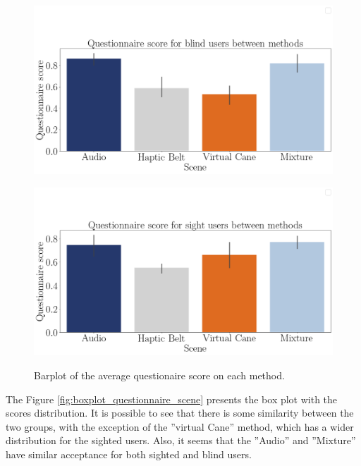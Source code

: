 \begin{figure}[!htb]
    \centering
    \begin{minipage}{\textwidth}
        \centering
        \includegraphics[width = 0.8\linewidth]{Resultados/Questionario/Figuras/png/barplot_questionnaire_scene_blind.png}
        \label{fig:barplot_questionnaire_scene_blind_2}
    \end{minipage}
    \begin{minipage}{\textwidth}
        \centering
        \includegraphics[width = 0.8\linewidth]{Resultados/Questionario/Figuras/png/barplot_questionnaire_scene_sight.png}
        \label{fig:barplot_questionnaire_scene_sight}
    \end{minipage}
    \caption{Barplot of the average questionaire score on each method.}
    \label{fig:barplot_questionnaire_scene_blind_sight}
\end{figure}

The Figure \ref{fig:boxplot_questionnaire_scene} presents the box plot with the scores distribution. It is possible to see that there is some similarity between the two groups, with the exception of the ”virtual Cane” method, which has a wider distribution for the sighted users. Also, it seems that the ”Audio” and ”Mixture” have similar acceptance for both sighted and blind users.

